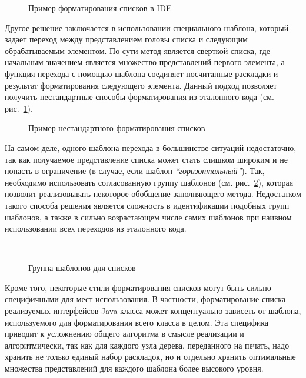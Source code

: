 \begin{figure}[h!]
  \caption{Пример форматирования списков в IDE}
\end{figure}

Другое решение заключается в использовании специального шаблона, который
задает переход между представлением головы списка и следующим обрабатываемым
элементом. По сути метод является сверткой списка, где начальным значением
является множество представлений первого элемента, а функция перехода с помощью
шаблона соединяет
посчитанные раскладки и результат форматирования следующего элемента.
Данный подход позволяет получить нестандартные способы форматирования
из эталонного кода (см. рис.~\ref{fig:listGoodLine}).

\begin{figure}[h!]
  
  \caption{Пример нестандартного форматирования списков}
  \label{fig:listGoodLine}
\end{figure}

На самом деле, одного шаблона перехода 
в большинстве ситуаций недостаточно,
так как получаемое представление списка может стать слишком широким и не попасть
в ограничение (в случае, если шаблон \emph{``горизонтальный''}).
Так, необходимо использовать согласованную группу шаблонов
(см. рис.~\ref{fig:tmpltGroup}), которая
позволит реализовывать некоторое обобщение заполняющего метода.
Недостатком такого способа решения является сложность в идентификации подобных
групп шаблонов, а также в сильно возрастающем числе самих шаблонов при наивном
использовании всех переходов из эталонного кода.

\begin{figure}[h!]
  \centering
  ~
  \caption{Группа шаблонов для списков}
  \label{fig:tmpltGroup}
\end{figure}

Кроме того, некоторые стили
форматирования списков могут быть сильно специфичными для мест использования.
В частности, форматирование списка реализуемых интерфейсов Java-класса может
концептуально зависеть от шаблона, используемого для форматирования всего класса
в целом. Эта специфика приводит к усложнению общего алгоритма в смысле реализации
и алгоритмически, так как для каждого узла дерева, переданного на печать,
надо хранить не только единый набор раскладок, но и отдельно хранить оптимальные
множества представлений для каждого шаблона более высокого уровня.

